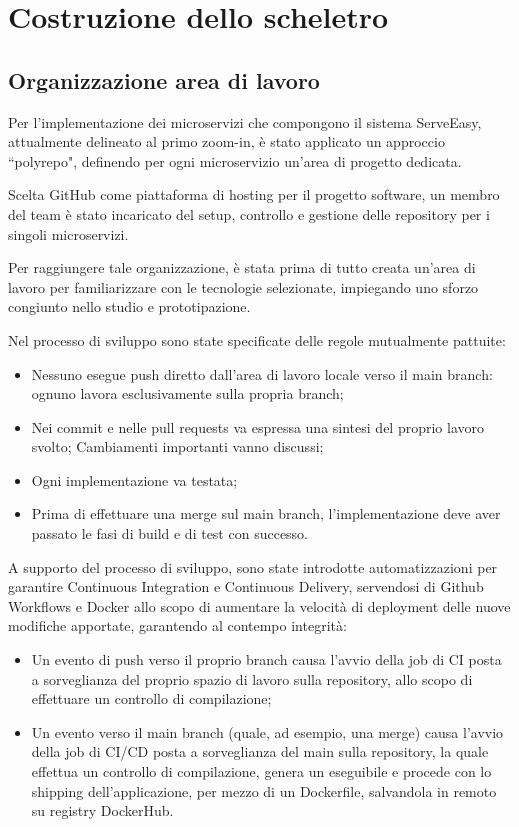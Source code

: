 \section{Costruzione dello scheletro}

\subsection{Organizzazione area di lavoro}
Per l’implementazione dei microservizi che compongono il sistema ServeEasy, attualmente delineato al primo zoom-in, è stato applicato un approccio “polyrepo"\cite{polyrepo}, definendo per ogni microservizio un’area di progetto dedicata. 

Scelta GitHub come piattaforma di hosting per il progetto software, un membro del team è stato incaricato del setup, controllo e gestione delle repository per i singoli microservizi.

Per raggiungere tale organizzazione, è stata prima di tutto creata un’area di lavoro per familiarizzare con le tecnologie selezionate, impiegando uno sforzo congiunto nello studio e prototipazione.

Nel processo di sviluppo sono state specificate delle regole mutualmente pattuite:
\begin{itemize}
    \item Nessuno esegue push diretto dall’area di lavoro locale verso il main branch: ognuno lavora esclusivamente sulla propria branch;
    \item Nei commit e nelle pull requests va espressa una sintesi del proprio lavoro svolto;
Cambiamenti importanti vanno discussi;
\item Ogni implementazione va testata;
\item Prima di effettuare una merge sul main branch, l’implementazione deve aver passato le fasi di build e di test con successo.
\end{itemize}

A supporto del processo di sviluppo, sono state introdotte automatizzazioni per garantire Continuous Integration e Continuous Delivery, servendosi di Github Workflows e Docker allo scopo di aumentare la velocità di deployment delle nuove modifiche apportate, garantendo al contempo integrità:
\begin{itemize}
    \item Un evento di push verso il proprio branch causa l’avvio della job di CI posta a sorveglianza del proprio spazio di lavoro sulla repository, allo scopo di effettuare un controllo di compilazione;
    \item Un evento verso il main branch (quale, ad esempio, una merge) causa l’avvio della job di CI/CD posta a sorveglianza del main sulla repository, la quale effettua un controllo di compilazione, genera un eseguibile e procede con lo shipping dell’applicazione, per mezzo di un Dockerfile, salvandola in remoto su registry DockerHub.
\end{itemize}

